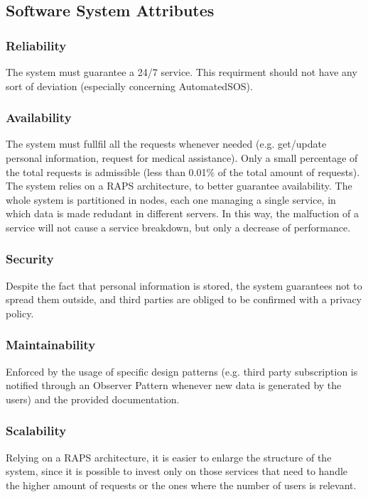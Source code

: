 \documentclass[12pt,a4paper]{article}
\begin{document}

	\subsection{Software System Attributes}
		\subsubsection{Reliability}
		The system must guarantee a 24/7 service. This requirment should not have any sort of deviation (especially concerning AutomatedSOS).
		\subsubsection{Availability}
		The system must fullfil all the requests whenever needed (e.g. get/update personal information, request for medical assistance). Only a small percentage of the total requests is admissible (less than 0.01\% of the total amount of requests). The system relies on a RAPS architecture, to better guarantee availability. The whole system is partitioned in nodes, each one managing a single service, in which data is made redudant in different servers. In this way, the malfuction of a service will not cause a service breakdown, but only a decrease of performance.
		\subsubsection{Security}
		Despite the fact that personal information is stored, the system guarantees not to spread them outside, and third parties are obliged to be confirmed with a privacy policy.
		\subsubsection{Maintainability}
		Enforced by the usage of specific design patterns (e.g. third party subscription is notified through an Observer Pattern whenever new data is generated by the users) and the provided documentation.
		\subsubsection{Scalability}
		Relying on a RAPS architecture, it is easier to enlarge the structure of the system, since it is possible to invest only on those services that need to handle the higher amount of requests or the ones where the number of users is relevant.
\end{document}
